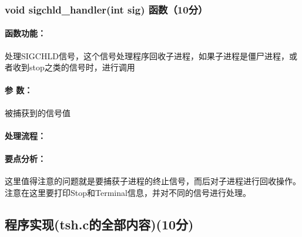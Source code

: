 \subsubsection{void sigchld\_handler(int sig) 函数（10分）}

\paragraph{函数功能：}处理SIGCHLD信号，这个信号处理程序回收子进程，如果子进程是僵尸进程，或者收到stop之类的信号时，进行调用
\paragraph{参   数：}被捕获到的信号值
\paragraph{处理流程：}
\paragraph{要点分析：}这里值得注意的问题就是要捕获子进程的终止信号，而后对子进程进行回收操作。注意在这里要打印Stop和Terminal信息，并对不同的信号进行处理。

\subsection{程序实现(tsh.c的全部内容)(10分)}
\inputminted{c}{../../../Experiment6/tsh.c}
